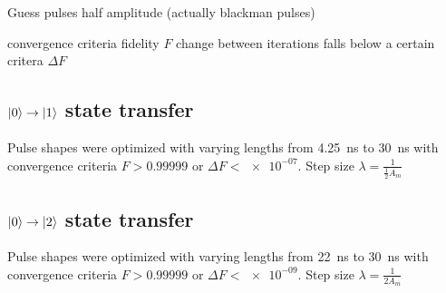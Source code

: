 \documentclass[main.tex]{subfiles}
\begin{document}
Guess pulses half amplitude (actually blackman pulses)

convergence criteria
fidelity \(F\)
change between iterations falls below a certain critera \(\Delta F\)

\subsection{\texorpdfstring{\boldmath\(\ket{0}\rightarrow\ket{1}\)}{0 -> 1} state transfer}
Pulse shapes were optimized with varying lengths from \SI{4.25}{\nano\second} to \SI{30}{\nano\second} with convergence criteria \(F>0.99999\) or \(\Delta F < \num{e-07}\). Step size \(\lambda = \frac{1}{\frac{1}{2}A_{m}}\)

\subsection{\texorpdfstring{\boldmath\(\ket{0}\rightarrow\ket{2}\)}{0 -> 2} state transfer}
Pulse shapes were optimized with varying lengths from \SI{22}{\nano\second} to \SI{30}{\nano\second} with convergence criteria \(F>0.99999\) or \(\Delta F < \num{e-09}\). Step size \(\lambda = \frac{1}{2A_{m}}\)
\end{document}
